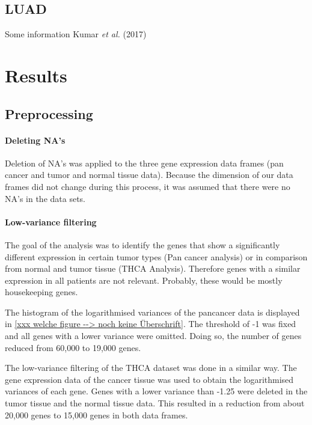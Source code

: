 \documentclass[
  parskip,
  oneside]{scrreprt}
\begin{document}
\hypertarget{luad}{%
\section{LUAD}\label{luad}}

Some information Kumar \emph{et al.} (2017)

\hypertarget{results}{%
\chapter{Results}\label{results}}

\hypertarget{preprocessing}{%
\section{Preprocessing}\label{preprocessing}}

\hypertarget{deleting-nas}{%
\subsubsection{Deleting NA's}\label{deleting-nas}}

Deletion of NA's was applied to the three gene expression data frames
(pan cancer and tumor and normal tissue data). Because the dimension of
our data frames did not change during this process, it was assumed that
there were no NA's in the data sets.

\hypertarget{low-variance-filtering}{%
\subsubsection{Low-variance filtering}\label{low-variance-filtering}}

The goal of the analysis was to identify the genes that show a
significantly different expression in certain tumor types (Pan cancer
analysis) or in comparison from normal and tumor tissue (THCA Analysis).
Therefore genes with a similar expression in all patients are not
relevant. Probably, these would be mostly housekeeping genes.

The histogram of the logarithmised variances of the pancancer data is
displayed in \ref{xxx welche figure --> noch keine Überschrift}. The
threshold of -1 was fixed and all genes with a lower variance were
omitted. Doing so, the number of genes reduced from 60,000 to 19,000
genes.

The low-variance filtering of the THCA dataset was done in a similar
way. The gene expression data of the cancer tissue was used to obtain
the logarithmised variances of each gene. Genes with a lower variance
than -1.25 were deleted in the tumor tissue and the normal tissue data.
This resulted in a reduction from about 20,000 genes to 15,000 genes in
both data frames.
\end{document}
